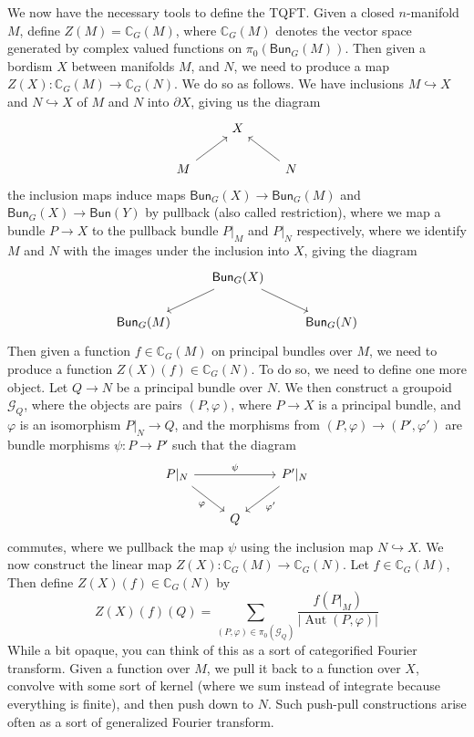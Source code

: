 \documentclass[psamsfonts, 11pt]{amsart}
\theoremstyle{definition}
\theoremstyle{remark}
\newcommand{\C}{\mathbb{C}}
\newcommand{\Bun}{\mathsf{Bun}}
\DeclareMathOperator{\Aut}{Aut}
\begin{document}
We now have the necessary tools to define the TQFT. Given a closed $n$-manifold $M$,
define $Z(M) = \C_G(M)$, where $\C_G(M)$ denotes the vector space generated by complex
valued functions on $\pi_0(\Bun_G(M))$. Then given a bordism $X$
between manifolds $M$, and $N$, we need to produce a map $Z(X) : \C_G(M) \to \C_G(N)$.
We do so as follows. We have inclusions $M \hookrightarrow X$ and $N \hookrightarrow X$
of $M$ and $N$ into $\partial X$, giving us the diagram
\[\begin{tikzcd}
& X \\
M\ar[ur] && N\ar[ul]
\end{tikzcd}\]
the inclusion maps induce maps $\Bun_G(X) \to \Bun_G(M)$ and $\Bun_G(X)\to \Bun(Y)$
by pullback (also called restriction), where we map a bundle $P \to X$ to the
pullback bundle $P\vert_M$ and $P\vert_N$ respectively, where we identify $M$
and $N$ with the images under the inclusion into $X$, giving the diagram
\[\begin{tikzcd}
& \Bun_G(X) \ar[dl]\ar[dr] \\
\Bun_G(M) && \Bun_G(N)
\end{tikzcd}\]
Then given a function $f \in \C_G(M)$ on principal bundles over $M$, we need to
produce a function $Z(X)(f) \in \C_G(N)$. To do so, we need to define one more
object. Let $Q \to N$ be a principal bundle over $N$. We then construct a
groupoid $\mathcal{G}_Q$, where the objects are pairs $(P, \varphi)$, where
$P \to X$ is a principal bundle, and $\varphi$ is an isomorphism $P\vert_N \to Q$,
and the morphisms from $(P, \varphi) \to (P', \varphi')$ are bundle morphisms
$\psi : P \to P'$ such that the diagram
\[\begin{tikzcd}
P\vert_N \ar[dr, "\varphi"']\ar[rr, "\psi"] && P'\vert_N \ar[dl, "\varphi'"]\\
& Q
\end{tikzcd}\]
commutes, where we pullback the map $\psi$ using the inclusion map $N \hookrightarrow X$.
We now construct the linear map $Z(X) : \C_G(M) \to \C_G(N)$. Let $f \in \C_G(M)$,
Then define $Z(X)(f) \in \C_G(N)$ by
\[
Z(X)(f)(Q) = \sum_{(P,\varphi) \in \pi_0(\mathcal{G}_Q)}
\frac{f(P\vert_M)}{|\Aut(P,\varphi)|}
\]
While a bit opaque, you can think of this as a sort of categorified Fourier transform.
Given a function over $M$, we pull it back to a function over $X$, convolve with
some sort of kernel (where we sum instead of integrate because everything is finite), and
then push down to $N$. Such push-pull constructions arise often as a sort of generalized
Fourier transform.
%
\end{document}
